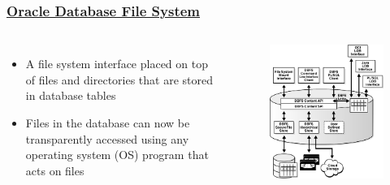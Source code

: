 % 
% 
% 
\begin{frame}[fragile]
	\frametitle{\href{https://docs.oracle.com/database/121/ADLOB/adlob_fs.htm\#ADLOB46182}{Oracle Database File System}}
\begin{columns}[c] %

	\begin{itemize}
		\item A file system interface placed on top of files and directories that are stored in database tables
		\item Files in the database can now be transparently accessed using any operating system (OS) program that acts on files
	\end{itemize}

		\begin{figure}
			\includegraphics[width=.75\linewidth]{figs/dbfs.png}
		\end{figure}
\end{columns}
\end{frame}

